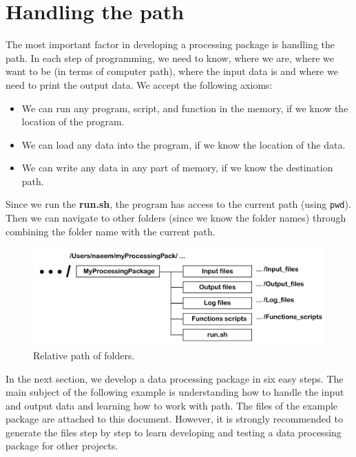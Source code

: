 \section{Handling the path}

The most important factor in developing a processing package is handling the path. In each step of programming, we need to know, where we are, where we want to be (in terms of computer path), where the input data is and where we need to print the output data. We accept the following axioms:

\begin{itemize}
  \item We can run any program, script, and function in the memory, if we know the location of the program.
  \item We can load any data into the program, if we know the location of the data.
  \item We can write any data in any part of memory, if we know the destination path. 
\end{itemize}

\noindent
Since we run the \textbf{run.sh}, the program has access to the current path (using \texttt{pwd}). Then we can navigate to other folders (since we know the folder names) through combining the folder name with the current path. 

\begin{figure} [ht]
\centering
\includegraphics[scale=0.6]{figures/pdf/Figure03.pdf} 
\caption{Relative path of folders.}
\label{fig:structure}
\end{figure}

\noindent
In the next section, we develop a data processing package in six easy steps. The main subject of the following example is understanding how to handle the input and output data and learning how to work with path. The files of the example package are attached to this document. However, it is strongly recommended to generate the files step by step to learn developing and testing a data processing package for other projects.
